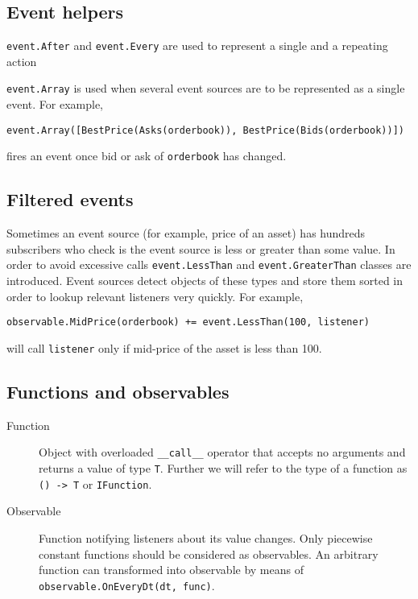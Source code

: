 \documentclass[a4paper,11pt]{article}
\begin{document}
\subsection{Event helpers}\label{event-helpers}

\texttt{event.After} and \texttt{event.Every} are used to represent a
single and a repeating action

\texttt{event.Array} is used when several event sources are to be
represented as a single event. For example,

\begin{verbatim}
event.Array([BestPrice(Asks(orderbook)), BestPrice(Bids(orderbook))])
\end{verbatim}

fires an event once bid or ask of \texttt{orderbook} has changed.

\subsection{Filtered events}\label{filtered-events}

Sometimes an event source (for example, price of an asset) has hundreds
subscribers who check is the event source is less or greater than some
value. In order to avoid excessive calls \texttt{event.LessThan} and
\texttt{event.GreaterThan} classes are introduced. Event sources detect
objects of these types and store them sorted in order to lookup relevant
listeners very quickly. For example,

\begin{verbatim}
observable.MidPrice(orderbook) += event.LessThan(100, listener)
\end{verbatim}

will call \texttt{listener} only if mid-price of the asset is less than
100.

\subsection{Functions and observables}\label{functions-and-observables}

\begin{description}
\item[Function]
Object with overloaded \texttt{\_\_call\_\_} operator that accepts no
arguments and returns a value of type \texttt{T}. Further we will refer
to the type of a function as \texttt{() -\textgreater{} T} or
\texttt{IFunction}.
\item[Observable]
Function notifying listeners about its value changes. Only piecewise
constant functions should be considered as observables. An arbitrary
function can transformed into observable by means of
\texttt{observable.OnEveryDt(dt, func)}.
\end{description}
\end{document}
